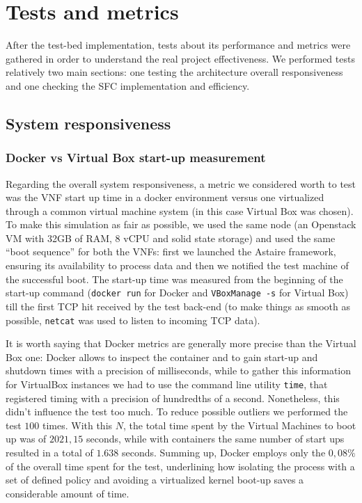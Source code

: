 \chapter{Tests and metrics}
\label{chap:test}
After the test-bed implementation, tests about its performance and metrics were
gathered in order to understand the real project effectiveness. We performed
tests relatively two main sections: one testing the architecture overall
responsiveness and one checking the SFC implementation and efficiency.

\section{System responsiveness}

\subsection{Docker vs Virtual Box start-up measurement}

Regarding the overall system responsiveness, a metric we considered worth to 
test was the VNF start up time in a docker environment versus one virtualized 
through a common virtual machine system (in this case Virtual Box was chosen). 
To make this simulation as fair as possible, we used the same node (an 
Openstack VM with 32GB of RAM, 8 vCPU and solid state storage) and used the 
same ``boot sequence'' for both the VNFs: first we launched the Astaire 
framework, ensuring its availability to process data and then we notified the 
test machine of the successful boot. The start-up time was measured from the 
beginning of the start-up command (\verb!docker run! for Docker and 
\verb!VBoxManage -s! for Virtual Box) till the first TCP hit received by the 
test back-end (to make things as smooth as possible, \verb!netcat! was used 
to listen to incoming TCP data).

It is worth saying that Docker metrics are generally more precise than the
Virtual Box one: Docker allows to inspect the container and to gain start-up and
shutdown times with a precision of milliseconds, while to gather this 
information for VirtualBox instances we had to use the command line utility 
\verb!time!, that registered timing with a precision of hundredths of a second. 
Nonetheless, this didn't influence the test too much. To reduce possible 
outliers we performed the test $100$ times. With this $N$, the total time spent 
by the Virtual Machines to boot up was of $2021,15$ seconds, while with 
containers the same number of start ups resulted in a total of $1.638$ seconds. 
Summing up, Docker employs only the $0,08\%$ of the overall time spent for the 
test, underlining how isolating the process with a set of defined policy and 
avoiding a virtualized kernel boot-up saves a considerable amount of time.

